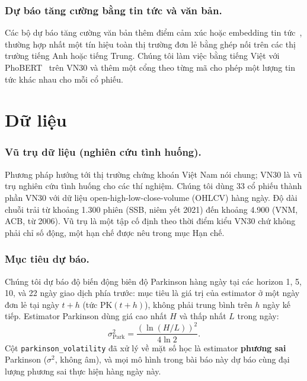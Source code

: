 \documentclass[runningheads]{llncs}
\begin{document}
\subsubsection{Dự báo tăng cường bằng tin tức và văn bản.}
Các bộ dự báo tăng cường văn bản thêm điểm cảm xúc hoặc embedding tin tức~\cite{ouyang2021,das2024},
thường hợp nhất một tín hiệu toàn thị trường đơn lẻ bằng ghép nối trên các thị trường tiếng Anh hoặc
tiếng Trung. Chúng tôi làm việc bằng tiếng Việt với PhoBERT~\cite{phobert2020} trên VN30 và thêm một cổng
theo từng mã cho phép một lượng tin tức khác nhau cho mỗi cổ phiếu.

\section{Dữ liệu}
\label{sec:data}

\subsubsection{Vũ trụ dữ liệu (nghiên cứu tình huống).}
Phương pháp hướng tới thị trường chứng khoán Việt Nam nói chung; VN30 là vũ trụ nghiên cứu tình huống
cho các thí nghiệm. Chúng tôi dùng 33 cổ phiếu thành phần VN30 với dữ liệu open-high-low-close-volume
(OHLCV) hàng ngày. Độ dài chuỗi trải từ khoảng 1.300 phiên (SSB, niêm yết 2021) đến khoảng 4.900 (VNM,
ACB, từ 2006). Vũ trụ là một tập cố định theo thời điểm kiểu VN30 chứ không phải chỉ số động, một hạn chế
được nêu trong mục Hạn chế.

\subsubsection{Mục tiêu dự báo.}
Chúng tôi dự báo độ biến động biên độ Parkinson hàng ngày tại các horizon 1, 5, 10, và 22 ngày giao dịch
phía trước: mục tiêu là giá trị của estimator ở một ngày đơn lẻ tại ngày $t{+}h$ (tức $\text{PK}(t{+}h)$),
không phải trung bình trên $h$ ngày kế tiếp. Estimator Parkinson dùng giá cao nhất $H$ và thấp nhất $L$
trong ngày:
\begin{equation}
\sigma^2_{\text{Park}} = \frac{\left(\ln(H/L)\right)^2}{4\ln 2}.
\label{eq:parkinson}
\end{equation}
Cột \texttt{parkinson\_volatility} đã xử lý về mặt số học là estimator \textbf{phương sai} Parkinson
($\sigma^2$, không âm), và mọi mô hình trong bài báo này dự báo cùng đại lượng phương sai thực hiện hàng
ngày này.
\end{document}
